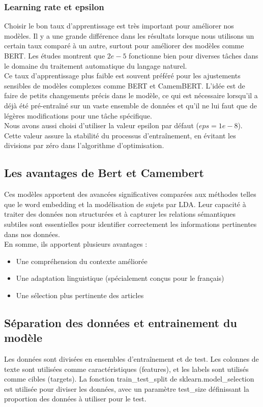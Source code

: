\documentclass{article}
\begin{document}
\subsubsection{Learning rate et epsilon}
Choisir le bon taux d'apprentissage est très important pour améliorer nos modèles. Il y a une grande différence dans les résultats lorsque nous utilisons un certain taux comparé à un autre, surtout pour améliorer des modèles comme BERT. Les études montrent que $2e-5$ fonctionne bien pour diverses tâches dans le domaine du traitement automatique du langage naturel. \cite{devlin2018bert} \\

Ce taux d'apprentissage plus faible est souvent préféré pour les ajustements sensibles de modèles complexes comme BERT et CamemBERT. L'idée est de faire de petits changements précis dans le modèle, ce qui est nécessaire lorsqu'il a déjà été pré-entraîné sur un vaste ensemble de données et qu'il ne lui faut que de légères modifications pour une tâche spécifique. \\

Nous avons aussi choisi d'utiliser la valeur epsilon par défaut ($eps=1e-8$). Cette valeur assure la stabilité du processus d'entraînement, en évitant les divisions par zéro dans l'algorithme d'optimisation. \cite{loshchilov2017decoupled} 

\subsection{Les avantages de Bert et Camembert}
Ces modèles apportent des avancées significatives comparées aux méthodes telles que le word embedding et la modélisation de sujets par LDA. Leur capacité à traiter des données non structurées et à capturer les relations sémantiques subtiles sont essentielles pour identifier correctement les informations pertinentes dans nos données. \\

En somme, ils apportent plusieurs avantages :
\begin{itemize}
    \item Une compréhension du contexte améliorée
    \item Une adaptation linguistique (spécialement conçus pour le français)
    \item Une sélection plus pertinente des articles
\end{itemize}

\subsection{Séparation des données et entrainement du modèle}
Les données sont divisées en ensembles d'entraînement et de test. Les colonnes de texte sont utilisées comme caractéristiques (features), et les labels sont utilisés comme cibles (targets). La fonction train\_test\_split de sklearn.model\_selection est utilisée pour diviser les données, avec un paramètre test\_size définissant la proportion des données à utiliser pour le test. \\
\end{document}
